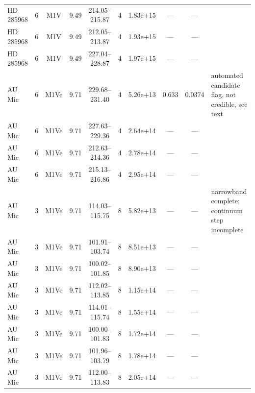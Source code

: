 \documentclass{openjournal}
\begin{document}
\begin{table}
\begin{tabularx}{\textwidth}{@{}l c c c c c c c c X@{}}
HD 285968 & 6 & M1V & 9.49 & 214.05--215.87 & 4 & 1.83e+15 & --- & --- &  \\
HD 285968 & 6 & M1V & 9.49 & 212.05--213.87 & 4 & 1.93e+15 & --- & --- &  \\
HD 285968 & 6 & M1V & 9.49 & 227.04--228.87 & 4 & 1.97e+15 & --- & --- &  \\
AU Mic & 6 & M1Ve & 9.71 & 229.68--231.40 & 4 & 5.26e+13 & 0.633 & 0.0374 & automated candidate flag, not credible, see text \\
AU Mic & 6 & M1Ve & 9.71 & 227.63--229.36 & 4 & 2.64e+14 & --- & --- &  \\
AU Mic & 6 & M1Ve & 9.71 & 212.63--214.36 & 4 & 2.78e+14 & --- & --- &  \\
AU Mic & 6 & M1Ve & 9.71 & 215.13--216.86 & 4 & 2.95e+14 & --- & --- &  \\
AU Mic & 3 & M1Ve & 9.71 & 114.03--115.75 & 8 & 5.82e+13 & --- & --- & narrowband complete; continuum step incomplete \\
AU Mic & 3 & M1Ve & 9.71 & 101.91--103.74 & 8 & 8.51e+13 & --- & --- &  \\
AU Mic & 3 & M1Ve & 9.71 & 100.02--101.85 & 8 & 8.90e+13 & --- & --- &  \\
AU Mic & 3 & M1Ve & 9.71 & 112.02--113.85 & 8 & 1.15e+14 & --- & --- &  \\
AU Mic & 3 & M1Ve & 9.71 & 114.01--115.74 & 8 & 1.55e+14 & --- & --- &  \\
AU Mic & 3 & M1Ve & 9.71 & 100.00--101.83 & 8 & 1.72e+14 & --- & --- &  \\
AU Mic & 3 & M1Ve & 9.71 & 101.96--103.79 & 8 & 1.78e+14 & --- & --- &  \\
AU Mic & 3 & M1Ve & 9.71 & 112.00--113.83 & 8 & 2.05e+14 & --- & --- &  \\
\hline
\end{tabularx}
\end{table}
\end{document}
